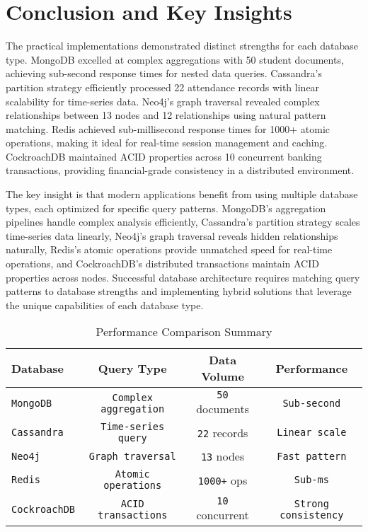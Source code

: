 \chapter{Conclusion and Key Insights}

The practical implementations demonstrated distinct strengths for each database type. MongoDB excelled at complex aggregations with 50 student documents, achieving sub-second response times for nested data queries. Cassandra's partition strategy efficiently processed 22 attendance records with linear scalability for time-series data. Neo4j's graph traversal revealed complex relationships between 13 nodes and 12 relationships using natural pattern matching. Redis achieved sub-millisecond response times for 1000+ atomic operations, making it ideal for real-time session management and caching. CockroachDB maintained ACID properties across 10 concurrent banking transactions, providing financial-grade consistency in a distributed environment.

The key insight is that modern applications benefit from using multiple database types, each optimized for specific query patterns. MongoDB's aggregation pipelines handle complex analysis efficiently, Cassandra's partition strategy scales time-series data linearly, Neo4j's graph traversal reveals hidden relationships naturally, Redis's atomic operations provide unmatched speed for real-time operations, and CockroachDB's distributed transactions maintain ACID properties across nodes. Successful database architecture requires matching query patterns to database strengths and implementing hybrid solutions that leverage the unique capabilities of each database type.

\begin{table}[H]
\centering
\begin{tabular}{|l|c|c|c|}
\hline
\textbf{Database} & \textbf{Query Type} & \textbf{Data Volume} & \textbf{Performance} \\
\hline
\texttt{MongoDB} & \texttt{Complex aggregation} & \texttt{50} documents & \texttt{Sub-second} \\
\texttt{Cassandra} & \texttt{Time-series query} & \texttt{22} records & \texttt{Linear scale} \\
\texttt{Neo4j} & \texttt{Graph traversal} & \texttt{13} nodes & \texttt{Fast pattern} \\
\texttt{Redis} & \texttt{Atomic operations} & \texttt{1000+} ops & \texttt{Sub-ms} \\
\texttt{CockroachDB} & \texttt{ACID transactions} & \texttt{10} concurrent & \texttt{Strong consistency} \\
\hline
\end{tabular}
\caption{Performance Comparison Summary}
\label{tab:performance-summary}
\end{table}